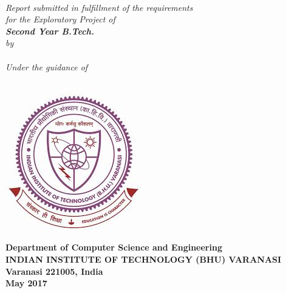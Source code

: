 \begin{titlepage}
\thispagestyle{empty}
\mbox{}
\begin{center}
\textheight 15.5in \textwidth 12.5in {\LARGE\bf  \the\phdtitle}\\[9ex]
\emph{Report submitted in fulfillment of the requirements\\
for the Exploratory Project of\\
[2ex]\large \bf Second Year B.Tech.
}\\
[2ex] \emph{by} \\[2ex]
{\large\sf \bf \the\name}\\ [7ex] 
\emph{Under the guidance of}\\[1ex]
{\large \sf \bf \the\guide} \\[7ex]

\vspace{.05in}
\begin{center}
 \includegraphics[scale=.7,keepaspectratio=true]{./logo.jpeg}
\end{center}
% 

\vspace{1cm}
{\small  \bf Department of Computer Science and Engineering}  \\[1ex]
{\small \bf{INDIAN INSTITUTE OF TECHNOLOGY (BHU) VARANASI \\
Varanasi 221005, India\\
  May 2017}}

\end{center}
\end{titlepage}
